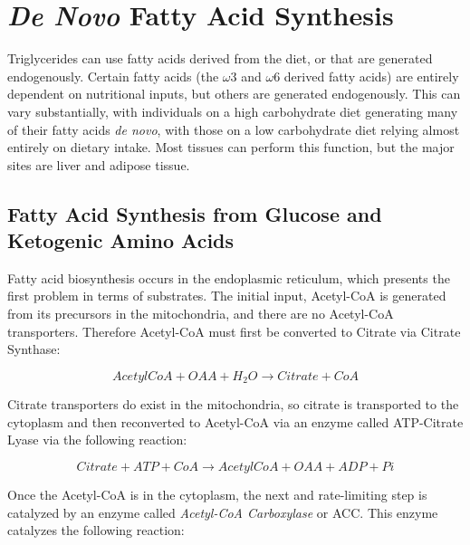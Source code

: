 \documentclass{tufte-handout}
\begin{document}
\section{\textit{De Novo} Fatty Acid Synthesis}

Triglycerides can use fatty acids derived from the diet, or that are generated endogenously.  Certain fatty acids (the $\omega$3 and $\omega$6 derived fatty acids) are entirely dependent on nutritional inputs, but others are generated endogenously.  This can vary substantially, with individuals on a high carbohydrate diet generating many of their fatty acids \textit{de novo}, with those on a low carbohydrate diet relying almost entirely on dietary intake.  Most tissues can perform this function, but the major sites are liver and adipose tissue.

\subsection{Fatty Acid Synthesis from Glucose and Ketogenic Amino Acids}


Fatty acid biosynthesis occurs in the endoplasmic reticulum, which presents the first problem in terms of substrates.  The initial input, Acetyl-CoA is generated from its precursors in the mitochondria, and there are no Acetyl-CoA transporters.  Therefore Acetyl-CoA must first be converted to Citrate via Citrate Synthase:


\begin{equation}\label{eq:acl}
AcetylCoA + OAA + H_2O \rightarrow Citrate + CoA
\end{equation}


Citrate transporters do exist in the mitochondria, so citrate is transported to the cytoplasm and then reconverted to Acetyl-CoA via an enzyme called ATP-Citrate Lyase via the following reaction:

\begin{equation}\label{eq:acl}
Citrate + ATP + CoA \rightarrow AcetylCoA + OAA + ADP + Pi
\end{equation}

Once the Acetyl-CoA is in the cytoplasm, the next and rate-limiting step is catalyzed by an enzyme called \emph{Acetyl-CoA Carboxylase} or ACC.  This enzyme catalyzes the following reaction:
\end{document}
